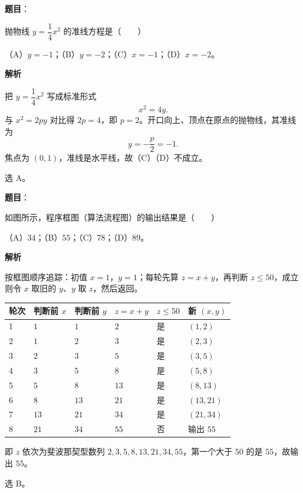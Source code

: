 \begin{answer}

\textbf{题目}：

抛物线 $y=\dfrac14x^2$ 的准线方程是\mbox{（　　）}

（A）$y=-1$；（B）$y=-2$；（C）$x=-1$；（D）$x=-2$。

\textbf{解析}

把 $y=\dfrac14x^2$ 写成标准形式
\nopagebreak[4]
\[x^2=4y .\]
与 $x^2=2py$ 对比得 $2p=4$，即 $p=2$。开口向上、顶点在原点的抛物线，其准线为
\nopagebreak[4]
\[y=-\frac p2=-1 .\]
焦点为 $(0,1)$，准线是水平线，故（C）（D）不成立。

选 A。


\end{answer}
\begin{answer}

\textbf{题目}：

如图所示，程序框图（算法流程图）的输出结果是\mbox{（　　）}

（A）$34$；（B）$55$；（C）$78$；（D）$89$。
\nopagebreak[4]
\begin{center}\end{center}
\nopagebreak[4]
\textbf{解析}

按框图顺序追踪：初值 $x=1$，$y=1$；每轮先算 $z=x+y$，再判断 $z\leqslant50$，成立则令 $x$ 取旧的 $y$、$y$ 取 $z$，然后返回。

\begin{center}
\begin{tabular}{llllll}
\toprule
轮次 & 判断前 $x$ & 判断前 $y$ & $z=x+y$ & $z\leqslant50$ & 新 $(x,y)$ \\
\midrule
1 & $1$ & $1$ & $2$ & 是 & $(1,2)$ \\
2 & $1$ & $2$ & $3$ & 是 & $(2,3)$ \\
3 & $2$ & $3$ & $5$ & 是 & $(3,5)$ \\
4 & $3$ & $5$ & $8$ & 是 & $(5,8)$ \\
5 & $5$ & $8$ & $13$ & 是 & $(8,13)$ \\
6 & $8$ & $13$ & $21$ & 是 & $(13,21)$ \\
7 & $13$ & $21$ & $34$ & 是 & $(21,34)$ \\
8 & $21$ & $34$ & $55$ & 否 & 输出 $55$ \\
\bottomrule
\end{tabular}
\end{center}

即 $z$ 依次为斐波那契型数列 $2,3,5,8,13,21,34,55$，第一个大于 $50$ 的是 $55$，故输出 $55$。

选 B。


\end{answer}
